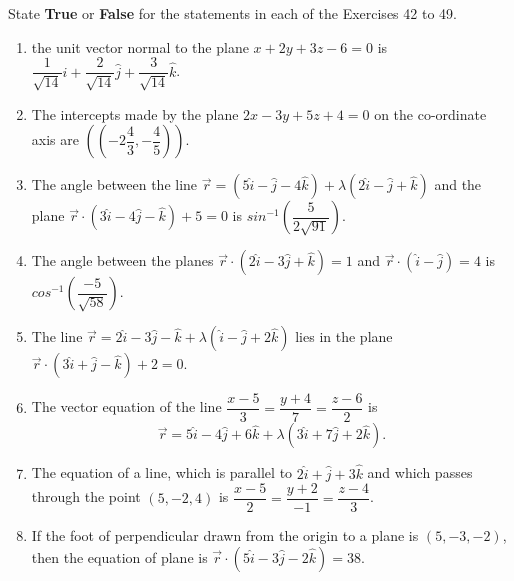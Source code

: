 \documentclass[12pt]{article}
\providecommand{\brak}[1]{\ensuremath{\left(#1\right)}}
\begin{document}
State \textbf{True} or \textbf{False} for the statements in each of the Exercises 42 to 49.
\begin{enumerate}[resume]
\item the unit vector normal to the plane $x+2y+3z-6=0$ is $\dfrac{1}{\sqrt{14}}\hat{i} + \dfrac{2}{\sqrt{14}}\hat{j} + \dfrac{3}{\sqrt{14}}\hat{k}$.
\item The intercepts made by the plane $2x-3y+5z+4=0$ on the co-ordinate axis are $\brak{(-2 \dfrac{4}{3},-\dfrac{4}{5})}$.
\item The angle between the line $\overrightarrow{r}=(5\hat{i}-\hat{j}-4\hat{k})+\lambda(2\hat{i}-\hat{j}+\hat{k})$ and the plane $\overrightarrow{r} \cdot (3\hat{i}-4\hat{j}-\hat{k})+5=0$ is $sin^{-1}\brak{\dfrac{5}{2\sqrt{91}}}$.
\item The angle between the planes $\overrightarrow{r} \cdot (2\hat{i}-3\hat{j}+\hat{k})=1$ and $\overrightarrow{r} \cdot (\hat{i}-\hat{j})=4$ is $cos^{-1} \brak{\dfrac{-5}{\sqrt{58}}}$.
\item The line $\overrightarrow{r}=2\hat{i}-3\hat{j}-\hat{k}+\lambda(\hat{i}-\hat{j}+2\hat{k})$ lies in the plane $\overrightarrow{r} \cdot (3\hat{i}+\hat{j}-\hat{k})+2=0$.
\item The vector equation of the line $\dfrac{x-5}{3}=\dfrac{y+4}{7}=\dfrac{z-6}{2}$ is
$$\overrightarrow{r}=5\hat{i}-4\hat{j}+6\hat{k}+\lambda(3\hat{i}+7\hat{j}+2\hat{k}).$$
\item The equation of a line, which is parallel to $2\hat{i}+\hat{j}+3\hat{k}$ and which passes through the point $(5,-2,4)$ is $\dfrac{x-5}{2}=\dfrac{y+2}{-1}=\dfrac{z-4}{3}$.
\item If the foot of perpendicular drawn from the origin to a plane is $(5,-3,-2)$, then the equation of plane is $\overrightarrow{r} \cdot (5\hat{i}-3\hat{j}-2\hat{k})=38.$
\end{enumerate}
\end{document}

